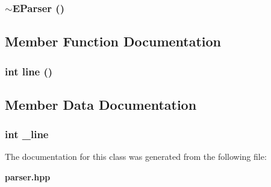 \subsubsection{\setlength{\rightskip}{0pt plus 5cm}$\sim${\bf EParser} ()\hspace{0.3cm}{\tt  [inline]}}\label{classEParser_a1}




\subsection{Member Function Documentation}
\subsubsection{\setlength{\rightskip}{0pt plus 5cm}int line ()\hspace{0.3cm}{\tt  [inline]}}\label{classEParser_a2}




\subsection{Member Data Documentation}
\subsubsection{\setlength{\rightskip}{0pt plus 5cm}int {\bf \_\-line}\hspace{0.3cm}{\tt  [protected]}}\label{classEParser_p0}




The documentation for this class was generated from the following file:\begin{CompactItemize}
\item 
{\bf parser.hpp}\end{CompactItemize}
